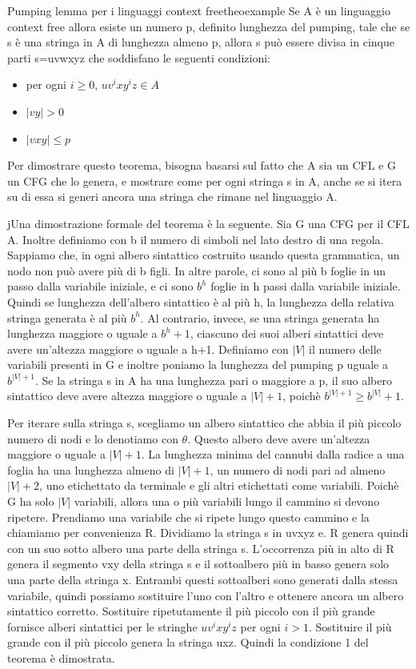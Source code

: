\documentclass[a4paper]{extarticle}
\begin{document}
\begin{teorema} {Pumping lemma per i linguaggi context free}{theoexample}
Se A è un linguaggio context free allora esiste un numero p, definito lunghezza del pumping, tale che se s è una stringa in A di lunghezza almeno p, allora s può essere divisa in cinque parti s=uvwxyz che soddisfano le seguenti condizioni:
\begin{itemize}
\item per ogni $i\geq 0$, $uv^ixy^iz \in A$
\item$|vy|>0$
\item $|vxy|\leq p$
\end{itemize}
\end{teorema}

Per dimostrare questo teorema, bisogna basarsi sul fatto che A sia un CFL e G un CFG che lo genera, e mostrare come per ogni stringa s in A, anche se si itera su di essa  si generi ancora una stringa che rimane nel linguaggio A.

jUna dimostrazione formale del teorema è la seguente. Sia G una CFG per il CFL A. Inoltre definiamo con b il numero di simboli nel lato destro di una regola. Sappiamo che, in ogni albero sintattico costruito usando questa grammatica, un nodo non può avere più di b figli. In altre parole, ci sono al più b foglie in un passo dalla variabile iniziale, e ci sono $b^h$ foglie in h passi dalla variabile iniziale. Quindi se lunghezza dell'albero sintattico è al più h, la lunghezza della relativa stringa generata è al più $b^h$. Al contrario, invece, se una stringa generata ha  lunghezza maggiore o uguale a $b^h+1$, ciascuno dei suoi alberi sintattici deve avere un'altezza maggiore o uguale a h+1. Definiamo con $|V|$ il numero delle variabili presenti in G e inoltre poniamo la lunghezza del pumping p uguale a $b^{|V|+1}$. Se la stringa s in A ha una lunghezza pari o maggiore a p, il suo albero sintattico deve avere altezza maggiore o uguale a $|V|+1$, poichè $b^{|V|+1}\geq b^{|V|}+1$. 

Per iterare sulla stringa s, scegliamo un albero sintattico che abbia il più piccolo numero di nodi e lo denotiamo con $\theta$. Questo albero deve avere un'altezza maggiore o uguale a $|V|+1$. La lunghezza minima del cannubi dalla radice a una foglia ha una lunghezza almeno di $|V|+1$, un numero di nodi pari ad almeno $|V|+2$, uno etichettato da terminale e gli altri etichettati come variabili. Poichè G ha solo $|V|$ variabili, allora una o più variabili lungo il cammino si devono ripetere. Prendiamo una variabile che si ripete lungo questo cammino e la chiamiamo per convenienza R. Dividiamo la stringa s in uvxyz e. R genera quindi con un suo sotto albero una parte della stringa s. L'occorrenza più in alto di R genera il segmento vxy della stringa s e il sottoalbero più in basso genera solo una parte della stringa x. Entrambi questi sottoalberi sono generati dalla stessa variabile, quindi possiamo sostituire l'uno con l'altro e ottenere ancora un albero sintattico corretto. Sostituire ripetutamente il più piccolo con il più grande fornisce alberi sintattici per le stringhe $uv^ixy^iz$ per ogni $i>1$. Sostituire il più grande con il più piccolo genera la stringa uxz. Quindi la condizione 1 del teorema è dimostrata.
\end{document}
